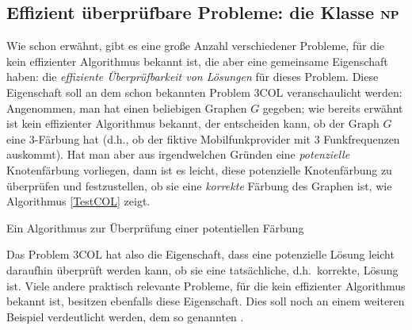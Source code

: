 \subsection{Effizient überprüfbare Probleme: die Klasse $\mathbf{N}\mathbf{P}$}

Wie schon erwähnt, gibt es eine große Anzahl verschiedener Probleme,
für die kein effizienter Algorithmus bekannt ist, die aber eine
gemeinsame Eigenschaft haben: die \emph{effiziente Überprüfbarkeit von
Lösungen} für dieses Problem. Diese Eigenschaft soll an dem schon
bekannten Problem $3\mathrm{COL}$ veranschaulicht werden: Angenommen,
man hat einen beliebigen Graphen $G$ gegeben; wie bereits erwähnt ist
kein effizienter Algorithmus bekannt, der entscheiden kann, ob der
Graph $G$ eine $3$-Färbung hat (d.h., ob der fiktive Mobilfunkprovider
mit $3$ Funkfrequenzen auskommt). Hat man aber aus irgendwelchen
Gründen eine \emph{potenzielle} Knotenfärbung vorliegen, dann ist es
leicht, diese potenzielle Knotenfärbung zu überprüfen und
festzustellen, ob sie eine \emph{korrekte} Färbung des Graphen ist, 
wie Algorithmus \ref{TestCOL} zeigt.

\begin{algorithm}[H]
\caption{Ein Algorithmus zur Überprüfung einer potentiellen Färbung}
\label{TestCOL}
\BlankLine
{}
\end{algorithm}

Das Problem $3\mathrm{COL}$ hat also die Eigenschaft, dass eine
potenzielle Lösung leicht daraufhin überprüft werden kann, ob sie eine
tatsächliche, d.h.~korrekte, Lösung ist.  Viele andere praktisch
relevante Probleme, für die kein effizienter Algorithmus bekannt ist,
besitzen ebenfalls diese Eigenschaft. Dies soll noch an einem weiteren
Beispiel verdeutlicht werden, dem so genannten
.

